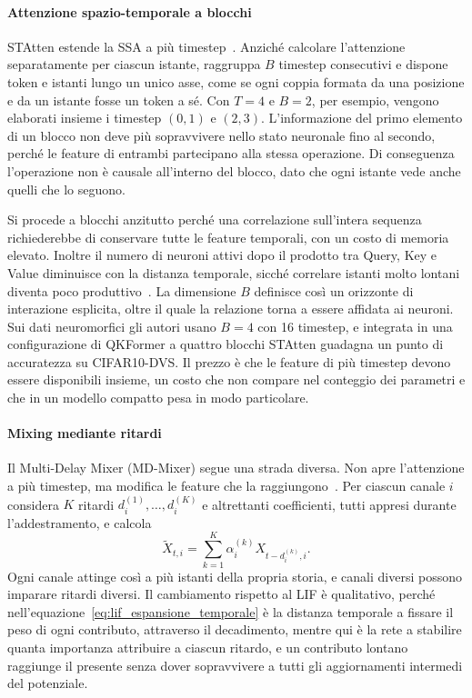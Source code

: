 \paragraph{Attenzione spazio-temporale a blocchi}
\label{subsec:statten}

STAtten estende la SSA a più timestep~\cite{lee2025spiking}. Anziché calcolare l'attenzione separatamente per ciascun istante, raggruppa $B$ timestep consecutivi e dispone token e istanti lungo un unico asse, come se ogni coppia formata da una posizione e da un istante fosse un token a sé. Con $T=4$ e $B=2$, per esempio, vengono elaborati insieme i timestep $(0,1)$ e $(2,3)$. L'informazione del primo elemento di un blocco non deve più sopravvivere nello stato neuronale fino al secondo, perché le feature di entrambi partecipano alla stessa operazione. Di conseguenza l'operazione non è causale all'interno del blocco, dato che ogni istante vede anche quelli che lo seguono.

Si procede a blocchi anzitutto perché una correlazione sull'intera sequenza richiederebbe di conservare tutte le feature temporali, con un costo di memoria elevato. Inoltre il numero di neuroni attivi dopo il prodotto tra Query, Key e Value diminuisce con la distanza temporale, sicché correlare istanti molto lontani diventa poco produttivo~\cite{lee2025spiking}. La dimensione $B$ definisce così un orizzonte di interazione esplicita, oltre il quale la relazione torna a essere affidata ai neuroni. Sui dati neuromorfici gli autori usano $B=4$ con 16 timestep, e integrata in una configurazione di QKFormer a quattro blocchi STAtten guadagna un punto di accuratezza su CIFAR10-DVS. Il prezzo è che le feature di più timestep devono essere disponibili insieme, un costo che non compare nel conteggio dei parametri e che in un modello compatto pesa in modo particolare.

\paragraph{Mixing mediante ritardi}
\label{subsec:mixing_ritardi}

Il Multi-Delay Mixer (MD-Mixer) segue una strada diversa. Non apre l'attenzione a più timestep, ma modifica le feature che la raggiungono~\cite{shi2026multidelay}. Per ciascun canale $i$ considera $K$ ritardi $d_i^{(1)},\dots,d_i^{(K)}$ e altrettanti coefficienti, tutti appresi durante l'addestramento, e calcola
\begin{equation}
\label{eq:md_mixer_combinazione}
\widetilde X_{t,i} = \sum_{k=1}^{K} \alpha_i^{(k)} X_{t-d_i^{(k)},i}.
\end{equation}
Ogni canale attinge così a più istanti della propria storia, e canali diversi possono imparare ritardi diversi. Il cambiamento rispetto al LIF è qualitativo, perché nell'equazione~\eqref{eq:lif_espansione_temporale} è la distanza temporale a fissare il peso di ogni contributo, attraverso il decadimento, mentre qui è la rete a stabilire quanta importanza attribuire a ciascun ritardo, e un contributo lontano raggiunge il presente senza dover sopravvivere a tutti gli aggiornamenti intermedi del potenziale.

